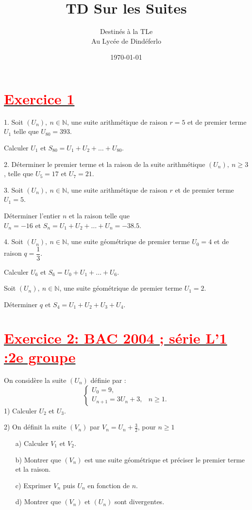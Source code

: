 \documentclass[12pt]{article}
\author{Destinés à la TLe\\Au Lycée de Dindéferlo}
\title{\textbf{TD Sur les Suites}}
\date{\today}
\begin{document}
\maketitle
\newpage
\section*{\underline{\textbf{\textcolor{red}{Exercice 1}}}}
1. Soit $\left(U_{n}\right),\ n\in\mathbb{N}$, une suite arithmétique de raison $r=5$ et de premier terme $U_{1}$ telle que $U_{80}=393$.
	
Calculer $U_{1}$ et $S_{80}=U_{1}+U_{2}+\ldots+U_{80}$.
	
2. Déterminer le premier terme et la raison de la suite arithmétique $\left(U_{n}\right),\ n\geq 3$, telle que $U_{5}=17$ et $U_{7}=21$.
	
3. Soit $\left(U_{n}\right),\ n\in\mathbb{N}$, une suite arithmétique de raison $r$ et de premier terme $U_{1}=5$.
	
Déterminer l'entier $n$ et la raison telle que\\ $U_{n}=-16$ et $S_{n}=U_{1}+U_{2}+\ldots+U_{n}=-38.5$.
	
4. Soit $\left(U_{n}\right),\ n\in\mathbb{N}$, une suite géométrique de premier terme $U_{0}=4$ et de raison $q=\dfrac{1}{3}$.
	
Calculer $U_{6}$ et $S_{6}=U_{0}+U_{1}+\ldots+U_{6}$.
	
Soit $\left(U_{n}\right),\ n\in\mathbb{N}$, une suite géométrique de premier terme $U_{1}=2$.
	
Déterminer $q$ et $S_{4}=U_{1}+U_{2}+U_{3}+U_{4}$.
\section*{\underline{\textbf{\textcolor{red}{Exercice 2: BAC 2004 ; série L’1 :2e groupe}}}}
On considère la suite $(U_n)$ définie par :
\[
\begin{cases}
    U_0 = 9, \\
    U_{n+1} = 3U_n + 3, & n \geq 1.
\end{cases}
\]
1) Calculer $U_2$ et $U_3$.

2) On définit la suite $(V_n)$ par $V_n = U_n + \frac{3}{2}$, pour $n\geq1$
\begin{enumerate}
    \item[a)] Calculer $V_1$ et $V_2$.
    
    \item[b)] Montrer que $(V_n)$ est une suite géométrique et préciser le premier terme et la raison.
    
    \item[c)] Exprimer $V_n$ puis $U_n$ en fonction de $n$.
    
    \item[d)] Montrer que $(V_n)$ et $(U_n)$ sont divergentes.
\end{enumerate}
\end{document}
